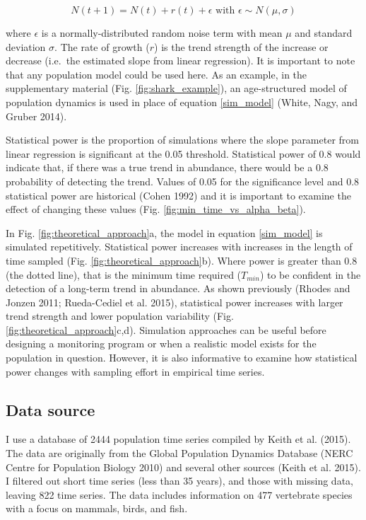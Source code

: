 \documentclass[12pt,]{article}
\begin{document}
\begin{equation}
N(t + 1) = N(t) + r(t) + \epsilon \mbox{ with } \epsilon \sim N(\mu, \sigma)
\label{sim_model}
\end{equation}

where \(\epsilon\) is a normally-distributed random noise term with mean
\(\mu\) and standard deviation \(\sigma\). The rate of growth (\(r\)) is
the trend strength of the increase or decrease (i.e.~the estimated slope
from linear regression). It is important to note that any population
model could be used here. As an example, in the supplementary material
(Fig. \ref{fig:shark_example}), an age-structured model of population
dynamics is used in place of equation \ref{sim_model} (White, Nagy, and
Gruber 2014).

Statistical power is the proportion of simulations where the slope
parameter from linear regression is significant at the 0.05 threshold.
Statistical power of 0.8 would indicate that, if there was a true trend
in abundance, there would be a 0.8 probability of detecting the trend.
Values of 0.05 for the significance level and 0.8 statistical power are
historical (Cohen 1992) and it is important to examine the effect of
changing these values (Fig. \ref{fig:min_time_vs_alpha_beta}).

In Fig. \ref{fig:theoretical_approach}a, the model in equation
\ref{sim_model} is simulated repetitively. Statistical power increases
with increases in the length of time sampled (Fig.
\ref{fig:theoretical_approach}b). Where power is greater than 0.8 (the
dotted line), that is the minimum time required (\(T_{min}\)) to be
confident in the detection of a long-term trend in abundance. As shown
previously (Rhodes and Jonzen 2011; Rueda-Cediel et al. 2015),
statistical power increases with larger trend strength and lower
population variability (Fig. \ref{fig:theoretical_approach}c,d).
Simulation approaches can be useful before designing a monitoring
program or when a realistic model exists for the population in question.
However, it is also informative to examine how statistical power changes
with sampling effort in empirical time series.

\subsection{Data source}\label{data-source}

I use a database of 2444 population time series compiled by Keith et al.
(2015). The data are originally from the Global Population Dynamics
Database (NERC Centre for Population Biology 2010) and several other
sources (Keith et al. 2015). I filtered out short time series (less than
35 years), and those with missing data, leaving 822 time series. The
data includes information on 477 vertebrate species with a focus on
mammals, birds, and fish.
\end{document}

